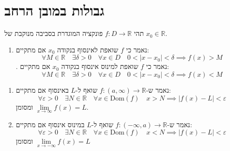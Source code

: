 \documentclass{tstextbook}
\begin{document}
\section{גבולות במובן הרחב}

\begin{definition}
תהי \(f:D\to \mathbb{R}\) פונקציה המוגדרת בסביבה מנוקבת של \(x_{0} \in \mathbb{R}\). 

  \begin{enumerate}
    \item נאמר כי \(f\) שואפת לאינסוף בנקודה \(x_{0}\) אם מתקיים: 
$$\forall M \in \mathbb{R}\quad \exists \delta > 0\quad  \forall x \in D\quad 0<\lvert x-x_{0} \rvert <\delta\implies f(x) > M$$
. נאמר כי \(f\) שואפת למינוס אינסוף בנקודה \(x_{0}\) אם מתקיים:
$$\forall M \in \mathbb{R}\quad \exists \delta > 0\quad  \forall x \in D\quad 0<\lvert x-x_{0} \rvert <\delta\implies f(x) < M$$
  \end{enumerate}
\end{definition}
\begin{definition}
  \begin{enumerate}
    \item נאמר ש-\(f:\left( a,\infty \right)\to \mathbb{R}\) שואף ל-\(L\) באינסוף אם מתקיים: 
$$\forall\varepsilon>0\quad \exists N \in \mathbb{R}\quad \forall x \in \mathrm{Dom}(f)\quad  x > N\implies \lvert f(x)-L \rvert <\varepsilon$$
ומסומן \(\underset{ x \to \infty }{\lim }f(x)=L\).


    \item נאמר ש-\(f:\left( -\infty,a \right)\to \mathbb{R}\) שואף ל-\(L\) במינוס אינסוף אם מתקיים: 
$$\forall\varepsilon>0\quad \exists N \in \mathbb{R}\quad \forall x \in \mathrm{Dom}(f)\quad  x < N\implies \lvert f(x)-L \rvert <\varepsilon$$
ומסומן \(\underset{ x \to -\infty }{\lim }f(x)=L\)


  \end{enumerate}
\end{definition}
\end{document}
